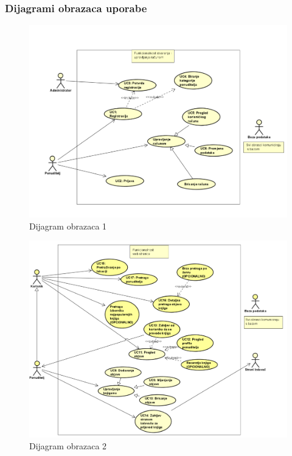 				\subsubsection{Dijagrami obrazaca uporabe}
					
				\begin{figure}
    					\centering
    					\includegraphics[width = \textwidth]{slike/DO1}
    					\caption{Dijagram obrazaca 1}
    					\label{fig:Dijagram obrazaca 1}
				\end{figure}



				\begin{figure}
    					\centering
    					\includegraphics[width = \textwidth]{slike/DO2}
    					\caption{Dijagram obrazaca 2}
    					\label{fig:Dijagram obrazaca 2}
				\end{figure}
				\eject	
					
